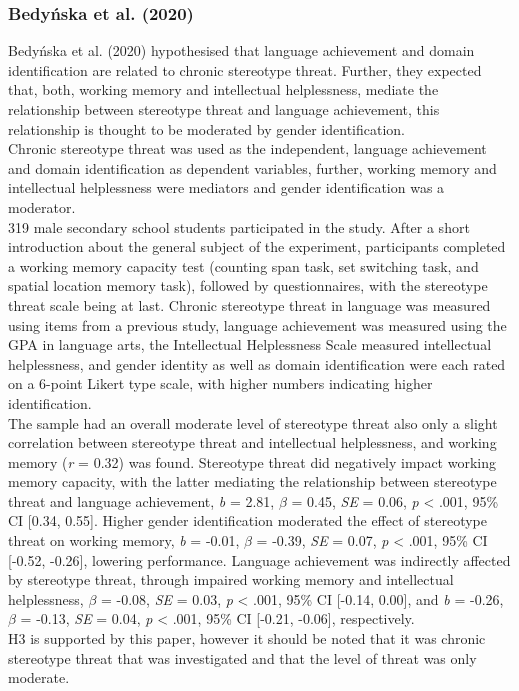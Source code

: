 \documentclass[
  stu,floatsintext]{apa7}
\begin{document}
\subsubsection{Bedyńska et al. (2020)}\label{bedynskastereotypethreatlinked2020}

Bedyńska et al. (2020) hypothesised that language achievement and domain identification are related to chronic stereotype threat.
Further, they expected that, both, working memory and intellectual helplessness, mediate the relationship between stereotype threat and language achievement, this relationship is thought to be moderated by gender identification.\\
Chronic stereotype threat was used as the independent, language achievement and domain identification as dependent variables, further, working memory and intellectual helplessness were mediators and gender identification was a moderator.\\
319 male secondary school students participated in the study.
After a short introduction about the general subject of the experiment, participants completed a working memory capacity test (counting span task, set switching task, and spatial location memory task), followed by questionnaires, with the stereotype threat scale being at last.
Chronic stereotype threat in language was measured using items from a previous study, language achievement was measured using the GPA in language arts, the Intellectual Helplessness Scale measured intellectual helplessness, and gender identity as well as domain identification were each rated on a 6-point Likert type scale, with higher numbers indicating higher identification.\\
The sample had an overall moderate level of stereotype threat also only a slight correlation between stereotype threat and intellectual helplessness, and working memory (\emph{r} = 0.32) was found.
Stereotype threat did negatively impact working memory capacity, with the latter mediating the relationship between stereotype threat and language achievement, \emph{b} = 2.81, \(\beta\) = 0.45, \emph{SE} = 0.06, \emph{p} \textless{} .001, 95\% CI {[}0.34, 0.55{]}.
Higher gender identification moderated the effect of stereotype threat on working memory, \emph{b} = -0.01, \(\beta\) = -0.39, \emph{SE} = 0.07, \emph{p} \textless{} .001, 95\% CI {[}-0.52, -0.26{]}, lowering performance.
Language achievement was indirectly affected by stereotype threat, through impaired working memory and intellectual helplessness, \(\beta\) = -0.08, \emph{SE} = 0.03, \emph{p} \textless{} .001, 95\% CI {[}-0.14, 0.00{]}, and \emph{b} = -0.26, \(\beta\) = -0.13, \emph{SE} = 0.04, \emph{p} \textless{} .001, 95\% CI {[}-0.21, -0.06{]}, respectively.\\
H3 is supported by this paper, however it should be noted that it was chronic stereotype threat that was investigated and that the level of threat was only moderate.
\end{document}
